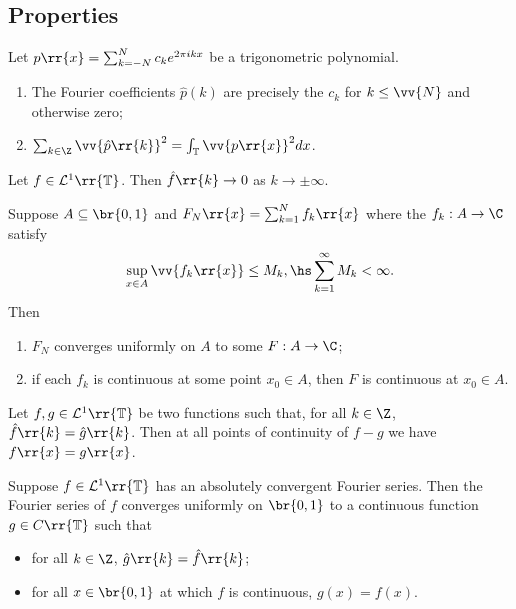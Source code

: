 \documentclass{article}
\begin{document}
\subsection{Properties}

\begin{lemma}
  Let $p\rr{x}=\sum_{k=-N}^{ N } c_k e^{2\pi i k x}$ be a trigonometric polynomial.
  \begin{enumerate}
    \item The Fourier coefficients $\hat p(k)$ are precisely the $c_k$
      for $k\leq\vv{N}$ and otherwise zero;
    \item $\sum_{k\in\Z}\vv{\hat p\rr{k}}^2 = \int_{\mathbb T}\vv{p\rr{x}}^2 dx$.
  \end{enumerate}
\end{lemma}

\begin{lemma}
  Let $f\in\mathcal L^1\rr{\mathbb T}$. Then $\hat f\rr{k}\to 0$ as $k\to \pm\infty$.
\end{lemma}

\begin{proposition}\label{prop:weierstrass_m_test}
  Suppose $A\subseteq\br{0,1}$ and $F_N\rr{x}=\sum_{k=1}^{ N } f_k\rr{x}$
  where the $f_k:A\to\C$ satisfy
  \begin{align*}
    \sup_{x\in A}\vv{f_k\rr{x}} \leq M_k,\hs \sum_{k=1}^{ \infty } M_k < \infty.
  \end{align*}
  Then
  \begin{enumerate}
    \item $F_N$ converges uniformly on $A$ to some $F:A\to\C$;
    \item if each $f_k$ is continuous at some point $x_0\in A$,
      then $F$ is continuous at $x_0\in A$.
  \end{enumerate}
\end{proposition}

\begin{lemma}
  Let $f,g\in\mathcal L^1\rr{\mathbb T}$ be two functions such that, for all $k\in\Z$, $\hat f\rr{k}=\hat g\rr{k}$.
  Then at all points of continuity of $f-g$ we have $f\rr{x}=g\rr{x}$.
\end{lemma}

\begin{theorem}
  Suppose $f\in\mathcal L^1\rr{\mathbb T}$ has an absolutely convergent Fourier
  series. Then the Fourier series of $f$ converges uniformly on $\br{0,1}$ to a
  continuous function $g\in C\rr{\mathbb T}$ such that
  \begin{itemize}
    \item for all $k\in\Z$, $\hat g\rr{k}=\hat f\rr{k}$;
    \item for all $x\in\br{0,1}$ at which $f$ is continuous, $g(x)=f(x)$.
  \end{itemize}
\end{theorem}
\end{document}
